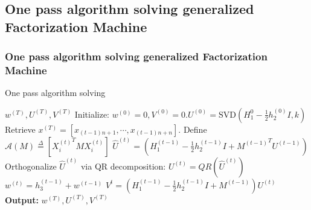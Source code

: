 \documentclass{beamer}
\begin{document}
\subsection{One pass algorithm solving generalized Factorization Machine}
\begin{frame}
\frametitle{One pass algorithm solving generalized Factorization Machine}
  \small \begin{algorithm}[H]
 \caption{One pass algorithm solving}
 \label{algo:alm}
 \begin{algorithmic}[1]
 \ENSURE $\mathit{w}^{(T)}, \mathit{U}^{(T)}, \mathit{V}^{(T)}$
 \STATE Initialize: $\mathit{w}^{(0)}=0, \mathit{V}^{(0)}=0. \mathit{U}^{(0)}=\mathrm{SVD}\left(H_1^{0}-\frac{1}{2}h_2^{(0)}I,k\right)$
     \STATE Retrieve $x^{(T)}=[x_{(t-1)n+1},\cdots,x_{(t-1)n+n}]$. Define $\mathcal{A}(M) \overset{\Delta}{=} \left[{X_i^{(t)}}^TMX_i^{(t)}\right]$
     \STATE $\hat{U}^{(t)}=\left(H_1^{(t-1)}-\frac{1}{2}h_2^{(t-1)}I+{M^{(t-1)}}^TU^{(t-1)}\right)$
     \STATE Orthogonalize $\hat{U}^{(t)}$ via QR decomposition: $U^{(t)}=QR(\hat{U}^{(t)})$  
     \STATE $\mathit{w}^{(t)}=\mathit{h}_3^{(t-1)}+\mathit{w}^{(t-1)}$
     \STATE $\mathit{V}^{t}=(\mathit{H}_1^{(t-1)}-\frac{1}{2}h_2^{(t-1)}I+\mathit{M}^{(t-1)})\mathit{U}^{(t)}$
    \ENDFOR
\STATE \textbf{Output:} $\mathit{w}^{(T)},\mathit{U}^{(T)},\mathit{V}^{(T)}$
 \end{algorithmic}
\end{algorithm}
\end{frame}
\end{document}
